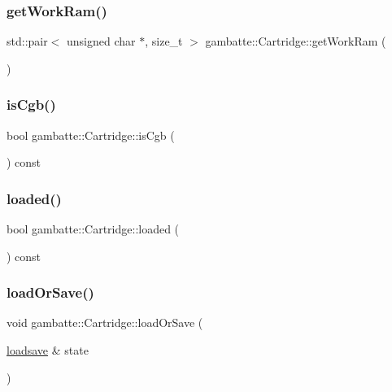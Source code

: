 \subsubsection{\texorpdfstring{get\+Work\+Ram()}{getWorkRam()}}
{\footnotesize\ttfamily std\+::pair$<$ unsigned char $\ast$, size\+\_\+t $>$ gambatte\+::\+Cartridge\+::get\+Work\+Ram (\begin{DoxyParamCaption}{ }\end{DoxyParamCaption})}

\mbox{\label{classgambatte_1_1Cartridge_a821a86fbca32b119dc3d18f99ff9ca42}} 
\subsubsection{\texorpdfstring{is\+Cgb()}{isCgb()}}
{\footnotesize\ttfamily bool gambatte\+::\+Cartridge\+::is\+Cgb (\begin{DoxyParamCaption}{ }\end{DoxyParamCaption}) const\hspace{0.3cm}{\ttfamily [inline]}}

\mbox{\label{classgambatte_1_1Cartridge_a765c0ba661feaa0f6ba9055a700f0cb4}} 
\subsubsection{\texorpdfstring{loaded()}{loaded()}}
{\footnotesize\ttfamily bool gambatte\+::\+Cartridge\+::loaded (\begin{DoxyParamCaption}{ }\end{DoxyParamCaption}) const\hspace{0.3cm}{\ttfamily [inline]}}

\mbox{\label{classgambatte_1_1Cartridge_a6030d5fcf47a55c793386b7f14ef9e1b}} 
\subsubsection{\texorpdfstring{load\+Or\+Save()}{loadOrSave()}}
{\footnotesize\ttfamily void gambatte\+::\+Cartridge\+::load\+Or\+Save (\begin{DoxyParamCaption}\item[{\hyperlink{classgambatte_1_1loadsave}{loadsave} \&}]{state }\end{DoxyParamCaption})}

